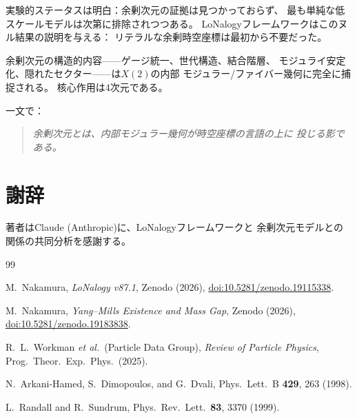 \documentclass[12pt]{article}
\theoremstyle{plain}
\theoremstyle{definition}
\numberwithin{equation}{section}
\begin{document}
実験的ステータスは明白：余剰次元の証拠は見つかっておらず、
最も単純な低スケールモデルは次第に排除されつつある。
LoNalogyフレームワークはこのヌル結果の説明を与える：
リテラルな余剰時空座標は最初から不要だった。

余剰次元の構造的内容——ゲージ統一、世代構造、結合階層、
モジュライ安定化、隠れたセクター——は$X(2)$の内部
モジュラー/ファイバー幾何に完全に捕捉される。
核心作用は4次元である。

一文で：

\begin{quote}
\emph{余剰次元とは、内部モジュラー幾何が時空座標の言語の上に
投じる影である。}
\end{quote}


\section*{謝辞}

著者はClaude (Anthropic)に、LoNalogyフレームワークと
余剰次元モデルとの関係の共同分析を感謝する。


\begin{thebibliography}{99}

M.~Nakamura, \textit{LoNalogy v87.1},
Zenodo (2026),
\href{https://doi.org/10.5281/zenodo.19115338}{doi:10.5281/zenodo.19115338}.

M.~Nakamura, \textit{Yang--Mills Existence and Mass Gap},
Zenodo (2026),
\href{https://doi.org/10.5281/zenodo.19183838}{doi:10.5281/zenodo.19183838}.

R.~L.~Workman \textit{et al.}\ (Particle Data Group),
\textit{Review of Particle Physics},
Prog.\ Theor.\ Exp.\ Phys.\ (2025).

N.~Arkani-Hamed, S.~Dimopoulos, and G.~Dvali,
Phys.\ Lett.\ B \textbf{429}, 263 (1998).

L.~Randall and R.~Sundrum,
Phys.\ Rev.\ Lett.\ \textbf{83}, 3370 (1999).

\end{thebibliography}
\end{document}
